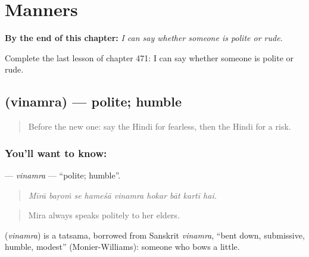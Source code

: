 
\chapter{Manners}
\label{ch:hi-manners}

\begin{chapteropening}
\textbf{By the end of this chapter:} \emph{I can say whether someone is polite or rude.}

Complete the last lesson of chapter 471: I can say whether someone is polite or rude.
\end{chapteropening}

\section[\texorpdfstring{\hi{विनम्र} (vinamra)}{विनम्र (vinamra)}]{ (vinamra) — polite; humble}

\label{lesson:HI-C471-vinamra}



\begin{quote}
Before the new one: say the Hindi for fearless, then the Hindi for a risk.
\end{quote}

\subsection*{You'll want to know: }
\textbf{} — \emph{vinamra} — \textquotedblleft{}polite; humble\textquotedblright{}.

\begin{quote}
        
\end{quote}

\begin{quote}
\emph{Mīrā baṛoṁ se hameśā vinamra hokar bāt kartī hai.}
\end{quote}

\begin{quote}
Mira always speaks politely to her elders.
\end{quote}

\begin{cousinweb}
\textbf{} (\emph{vinamra}) is a tatsama, borrowed from Sanskrit \emph{vinamra}, \textquotedblleft{}bent down, submissive, humble, modest\textquotedblright{} (Monier-Williams): someone who bows a little.
\end{cousinweb}


